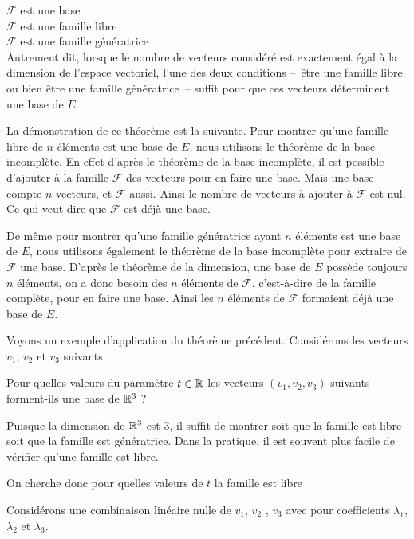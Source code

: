 $\mathcal{F}$ est une base \\

$\mathcal{F}$ est une famille libre \\
 
 $\mathcal{F}$ est une famille génératrice \\
 
 Autrement dit, lorsque le nombre de vecteurs considéré est 
exactement égal à la dimension de l'espace vectoriel, 
l'une des deux conditions --~être une famille libre ou bien \^etre une famille génératrice~--
suffit pour que ces vecteurs déterminent une base de $E$.

\change
La démonstration de ce théorème est la suivante. 
Pour montrer qu'une famille libre de $n$ éléments est une base de $E$, nous utilisons le théorème de la base incomplète. En effet d'après le théorème de la base incomplète, il est possible d'ajouter à la famille $\mathcal{F}$ des vecteurs pour en faire une base. Mais une base compte $n$ vecteurs, et $\mathcal{F}$ aussi. Ainsi le nombre de vecteurs à ajouter à $\mathcal{F}$ est nul. Ce qui veut dire que $\mathcal{F}$ est déjà une base.

\change
De m\^eme pour montrer qu'une famille génératrice ayant $n$ éléments est une base de $E$, nous utilisons également le théorème de la base incomplète pour extraire de $\mathcal{F}$ une base. D'après le théorème de la dimension, une base de $E$ possède toujours $n$ éléments, on a donc besoin des $n$ éléments de $\mathcal{F}$, c'est-à-dire de la famille complète,  pour en faire une base. Ainsi les $n$ éléments de $\mathcal{F}$ formaient déjà une base de $E$.

\diapo
Voyons un exemple d'application du théorème précédent.
Considérons les vecteurs $v_1$, $v_2$ et $v_3$ suivants.


\change
Pour quelles valeurs du paramètre  $t\in\mathbb{R}$ les vecteurs $(v_1,v_2,v_3)$ suivants forment-ils  une base de $\mathbb{R}^3$ ?


\change
Puisque la dimension de $\mathbb{R}^3$ est 3, 
  il suffit  de montrer soit que la famille est libre soit que la famille est génératrice.
  Dans la pratique, il est souvent plus facile de vérifier qu'une famille est libre.

\change
On cherche donc pour quelles valeurs de $t$ la famille est libre

\change
Considérons une combinaison linéaire nulle de $v_1$, $v_2$ , $v_3$ avec pour coefficients $\lambda_1$, $\lambda_2$ et $\lambda_3$. 

